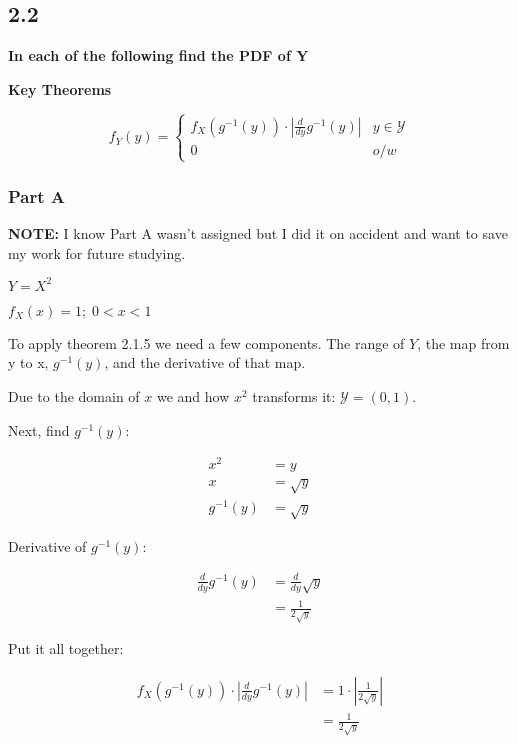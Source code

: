 \subsection*{2.2}

\textbf{In each of the following find the PDF of Y}

\noindent \textbf{Key Theorems}

\begin{theorem}[2.1.5]
	\[f_Y(y) = \begin{cases}
		f_X(g^{-1}(y)) \cdot \left| \frac{d}{dy} g^{-1}(y) \right| & y \in \mathcal{Y} \\
		0 & o/w
	\end{cases}\]
\end{theorem}

\subsubsection*{Part A}

\textbf{NOTE:} I know Part A wasn't assigned but I did it on accident and want to save my work for future studying.

$Y = X^2$

$f_X(x) = 1; \; 0 < x < 1$

To apply theorem 2.1.5 we need a few components. The range of $Y$, the map from y to x, $g^{-1}(y)$, and the derivative of that map. 

Due to the domain of $x$ we and how $x^2$ transforms it: $\mathcal{Y} = (0,1)$.

\noindent Next, find $g^{-1}(y)$:

\begin{align*}
	x^2 &= y \\
	x &= \sqrt{y} \\
	g^{-1}(y) &= \sqrt{y}
\end{align*}

\noindent Derivative of $g^{-1}(y)$:

\begin{align*}
	\frac{d}{dy} g^{-1}(y) &= \frac{d}{dy} \sqrt{y} \\
	&= \frac{1}{2\sqrt{y}}
\end{align*}

\noindent Put it all together:

\begin{align*}
	f_X(g^{-1}(y)) \cdot \left|\frac{d}{dy} g^{-1}(y) \right| &= 1 \cdot \left| \frac{1}{2\sqrt{y}} \right| \\
	&= \frac{1}{2\sqrt{y}}
\end{align*}


